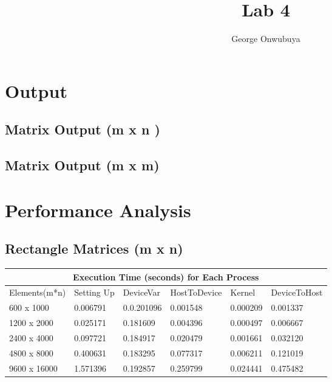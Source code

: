 \documentclass{article}
\title{Lab 4}
\author{George Onwubuya}
\begin{document}
\maketitle

\section{Output}
\subsection{Matrix Output (m x n )}

\subsection{Matrix Output (m x m)}

 \section{Performance Analysis}
 \subsection{Rectangle Matrices (m x n)} 
 \setlength{\parindent}{1cm}
 \begin{tabular}{ |p{2.5cm}||p{2cm}|p{2cm}|p{2cm}|p{2cm}|p{2cm}|  }
 \hline
 \multicolumn{6}{|c|}{Execution Time (seconds) for Each Process } \\
 \hline
Elements(m*n) & Setting Up & DeviceVar & HostToDevice & Kernel & DeviceToHost\\
 \hline
 600 x 1000 & 0.006791 & 0.0.201096 & 0.001548 & 0.000209 & 0.001337\\
 \hline
 1200 x 2000 & 0.025171 & 0.181609  & 0.004396 & 0.000497 & 0.006667\\
 \hline
 2400 x 4000 & 0.097721 & 0.184917 & 0.020479 & 0.001661 & 0.032120\\
 \hline
 4800 x 8000 & 0.400631  & 0.183295 & 0.077317 & 0.006211 & 0.121019\\
 \hline
 9600 x 16000 & 1.571396  & 0.192857 & 0.259799 & 0.024441 & 0.475482\\
 \hline
 \end{tabular}
 \\
 \\
 \\
\end{document}
